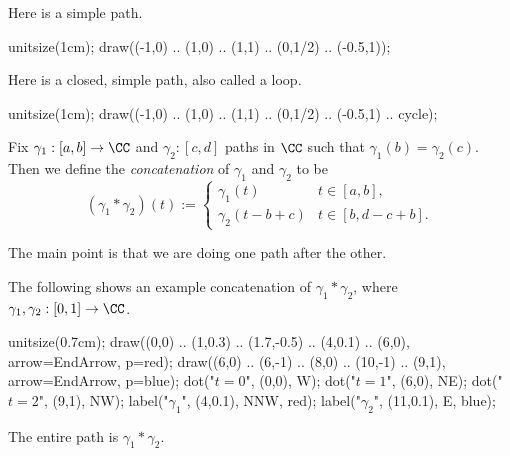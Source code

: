 \begin{example}
	Here is a simple path.
	\begin{center}
		\begin{asy}
			unitsize(1cm);
			draw((-1,0) .. (1,0) .. (1,1) .. (0,1/2) .. (-0.5,1));
		\end{asy}
	\end{center}
\end{example}
\begin{example}
	Here is a closed, simple path, also called a loop.
	\begin{center}
		\begin{asy}
			unitsize(1cm);
			draw((-1,0) .. (1,0) .. (1,1) .. (0,1/2) .. (-0.5,1) .. cycle);
		\end{asy}
	\end{center}
\end{example}
\begin{definition}[Concatenation]
	Fix $\gamma_1:[a,b]\to\CC$ and $\gamma_2:[c,d]$ paths in $\CC$ such that $\gamma_1(b)=\gamma_2(c)$. Then we define the \textit{concatenation} of $\gamma_1$ and $\gamma_2$ to be
	\[(\gamma_1*\gamma_2)(t):=\begin{cases}
		\gamma_1(t) & t\in[a,b], \\
		\gamma_2(t-b+c) & t\in[b,d-c+b].
	\end{cases}\]
\end{definition}
The main point is that we are doing one path after the other.
\begin{example}
	The following shows an example concatenation of $\gamma_1*\gamma_2$, where $\gamma_1,\gamma_2:[0,1]\to\CC$.
	\begin{center}
		\begin{asy}
			unitsize(0.7cm);
			draw((0,0) .. (1,0.3) .. (1.7,-0.5) .. (4,0.1) .. (6,0), arrow=EndArrow, p=red);
			draw((6,0) .. (6,-1) .. (8,0) .. (10,-1) .. (9,1), arrow=EndArrow, p=blue);
			dot("$t=0$", (0,0), W);
			dot("$t=1$", (6,0), NE);
			dot("$t=2$", (9,1), NW);
			label("$\gamma_1$", (4,0.1), NNW, red);
			label("$\gamma_2$", (11,0.1), E, blue);
		\end{asy}
	\end{center}
	The entire path is $\gamma_1*\gamma_2$.
\end{example}

